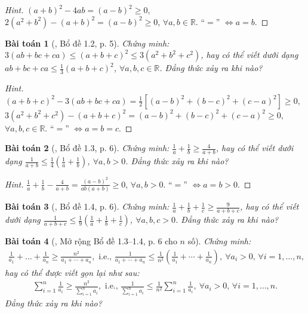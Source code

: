 \documentclass{article}
\newtheorem{baitoan}{Bài toán}
\begin{document}
\begin{proof}[Hint]
	$(a + b)^2 - 4ab = (a - b)^2\ge 0$, $2(a^2 + b^2) - (a + b)^2 = (a - b)^2\ge 0$, $\forall a,b\in\mathbb{R}$. ``$=$'' $\Leftrightarrow a = b$.
\end{proof}

\begin{baitoan}[\cite{Son_Nghiep_Trung_Can2021}, Bổ đề 1.2, p. 5]
	Chứng minh: $3(ab + bc + ca)\le(a + b + c)^2\le3(a^2 + b^2 + c^2)$, hay có thể viết dưới dạng $ab + bc + ca\le\frac{1}{3}(a + b + c)^2$, $\forall a,b,c\in\mathbb{R}$. Đẳng thức xảy ra khi nào?
\end{baitoan}

\begin{proof}[Hint]
	$(a + b + c)^2 - 3(ab + bc + ca) = \frac{1}{2}\left[(a - b)^2 + (b - c)^2 + (c - a)^2\right]\ge 0$, $3(a^2 + b^2 + c^2) - (a + b + c)^2 = (a - b)^2 + (b - c)^2 + (c - a)^2\ge 0$, $\forall a,b,c\in\mathbb{R}$. ``$=$'' $\Leftrightarrow a = b = c$.
\end{proof}

\begin{baitoan}[\cite{Son_Nghiep_Trung_Can2021}, Bổ đề 1.3, p. 6]
	Chứng minh: $\frac{1}{a} + \frac{1}{b}\ge\frac{4}{a + b}$, hay có thể viết dưới dạng $\frac{1}{a + b}\le\frac{1}{4}\left(\frac{1}{a} + \frac{1}{b}\right)$, $\forall a,b > 0$. Đẳng thức xảy ra khi nào?
\end{baitoan}

\begin{proof}[Hint]
	$\frac{1}{a} + \frac{1}{b} - \frac{4}{a + b} = \frac{(a - b)^2}{ab(a + b)}\ge 0$, $\forall a,b > 0$. ``$=$'' $\Leftrightarrow a = b > 0$.
\end{proof}

\begin{baitoan}[\cite{Son_Nghiep_Trung_Can2021}, Bổ đề 1.4, p. 6]
	Chứng minh: $\frac{1}{a} + \frac{1}{b} + \frac{1}{c}\ge\frac{9}{a + b + c}$, hay có thể viết dưới dạng $\frac{1}{a + b + c}\le\frac{1}{9}\left(\frac{1}{a} + \frac{1}{b} + \frac{1}{c}\right)$, $\forall a,b,c > 0$. Đẳng thức xảy ra khi nào?
\end{baitoan}

\begin{baitoan}[\cite{Son_Nghiep_Trung_Can2021}, Mở rộng Bổ đề 1.3--1.4, p. 6 cho $n$ số]
	Chứng minh:
	\begin{align*}
		\frac{1}{a_1} + \ldots + \frac{1}{a_n}\ge\frac{n^2}{a_1 + \cdots + a_n},\mbox{ i.e., }\frac{1}{a_1 + \cdots + a_n}\le\frac{1}{n^2}\left(\frac{1}{a_1} + \cdots + \frac{1}{a_n}\right),\ \forall a_i > 0,\,\forall i = 1,\ldots,n,
	\end{align*}
	hay có thể được viết gọn lại như sau:
	\begin{align*}
		\sum_{i=1}^{n} \frac{1}{a_i}\ge\frac{n^2}{\sum_{i=1}^n a_i},\mbox{ i.e., }\frac{1}{\sum_{i=1}^n a_i}\le\frac{1}{n^2}\sum_{i=1}^n \frac{1}{a_i},\ \forall a_i > 0,\,\forall i = 1,\ldots,n.
	\end{align*}
	Đẳng thức xảy ra khi nào?
\end{baitoan}
\end{document}

